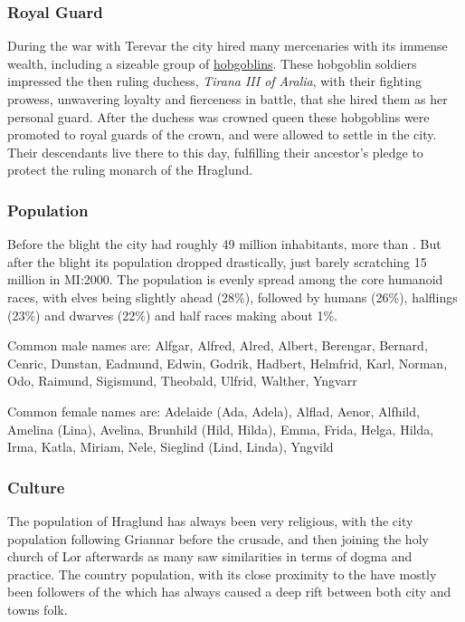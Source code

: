 \subsubsection{Royal Guard}
\label{sec:Royal Guard of Hraglund}

During the war with Terevar the city hired many mercenaries with its immense
wealth, including a sizeable group of \hyperref[sec:Hobgoblins]{hobgoblins}.
These hobgoblin soldiers impressed the then ruling duchess, \emph{Tirana III
  of Aralia}, with their fighting prowess, unwavering loyalty and fierceness
in battle, that she hired them as her personal guard. After the duchess was
crowned queen these hobgoblins were promoted to royal guards of the crown, and
were allowed to settle in the city. Their descendants live there to this day,
fulfilling their ancestor's pledge to protect the ruling monarch of the
Hraglund.

\subsubsection{Population}

Before the blight the city had roughly 49 million inhabitants, more than
. But after the blight its population dropped
drastically, just barely scratching 15 million in MI:2000. The population
is evenly spread among the core humanoid races, with elves being slightly
ahead (28\%), followed by humans (26\%), halflings (23\%) and dwarves
(22\%) and half races making about 1\%.

Common male names are: Alfgar, Alfred, Alred, Albert, Berengar, Bernard,
Cenric, Dunstan, Eadmund, Edwin, Godrik, Hadbert, Helmfrid, Karl, Norman,
Odo, Raimund, Sigismund, Theobald, Ulfrid, Walther, Yngvarr

Common female names are: Adelaide (Ada, Adela), Alflad, Aenor, Alfhild,
Amelina (Lina), Avelina, Brunhild (Hild, Hilda), Emma, Frida, Helga,
Hilda, Irma, Katla, Miriam, Nele, Sieglind (Lind, Linda), Yngvild

\subsubsection{Culture}

The population of Hraglund has always been very religious, with the city
population following Griannar before the crusade, and then joining the holy
church of Lor afterwards as many saw similarities in terms of dogma and
practice. The country population, with its close proximity to the
 have mostly been followers of the  which has always caused a deep rift between both city and towns folk.


